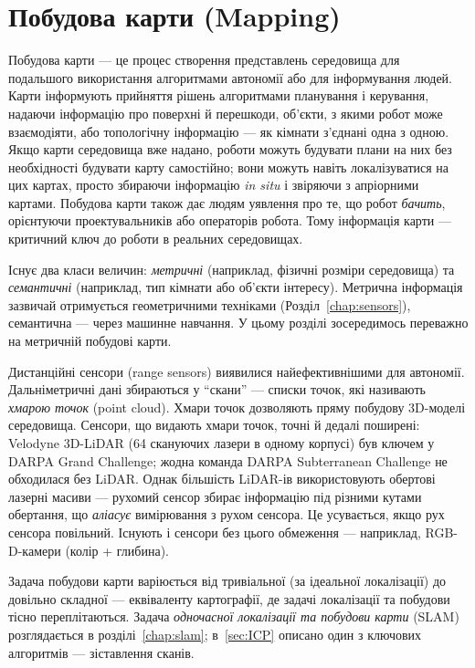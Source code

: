 \chapter{Побудова карти (Mapping)}\label{chap:mapping}
Побудова карти — це процес створення представлень середовища для подальшого використання алгоритмами автономії або для інформування людей. Карти інформують прийняття рішень алгоритмами планування і керування, надаючи інформацію про поверхні й перешкоди, об'єкти, з якими робот може взаємодіяти, або топологічну інформацію — як кімнати з'єднані одна з одною. Якщо карти середовища вже надано, роботи можуть будувати плани на них без необхідності будувати карту самостійно; вони можуть навіть локалізуватися на цих картах, просто збираючи інформацію \emph{in situ} і звіряючи з апріорними картами. Побудова карти також дає людям уявлення про те, що робот \emph{бачить}, орієнтуючи проектувальників або операторів робота. Тому інформація карти — критичний ключ до роботи в реальних середовищах.

Існує два класи величин: \emph{метричні} (наприклад, фізичні розміри середовища) та \emph{семантичні} (наприклад, тип кімнати або об'єкти інтересу). Метрична інформація зазвичай отримується геометричними техніками (Розділ~\ref{chap:sensors}), семантична — через машинне навчання. У цьому розділі зосередимось переважно на метричній побудові карти.

Дистанційні сенсори (range sensors) виявилися найефективнішими для автономії. Дальніметричні дані збираються у ``скани'' — списки точок, які називають \emph{хмарою точок} (point cloud). Хмари точок дозволяють пряму побудову 3D-моделі середовища. Сенсори, що видають хмари точок, точні й дедалі поширені: Velodyne 3D-LiDAR (64 скануючих лазери в одному корпусі) був ключем у DARPA Grand Challenge; жодна команда DARPA Subterranean Challenge не обходилася без LiDAR. Однак більшість LiDAR-ів використовують обертові лазерні масиви — рухомий сенсор збирає інформацію під різними кутами обертання, що \emph{аліасує} вимірювання з рухом сенсора. Це усувається, якщо рух сенсора повільний. Існують і сенсори без цього обмеження — наприклад, RGB-D-камери (колір + глибина).

Задача побудови карти варіюється від тривіальної (за ідеальної локалізації) до довільно складної — еквіваленту картографії, де задачі локалізації та побудови тісно переплітаються. Задача \emph{одночасної локалізації та побудови карти} (SLAM) розглядається в розділі~\ref{chap:slam}; в~\ref{sec:ICP} описано один з ключових алгоритмів — зіставлення сканів.

